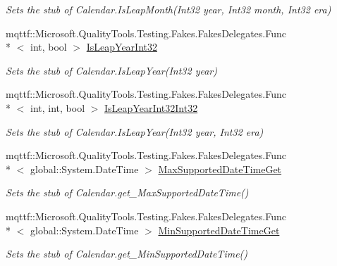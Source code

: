 \begin{DoxyCompactItemize}
\begin{DoxyCompactList}\small\item\em Sets the stub of Calendar.\-Is\-Leap\-Month(\-Int32 year, Int32 month, Int32 era)\end{DoxyCompactList}\item 
mqttf\-::\-Microsoft.\-Quality\-Tools.\-Testing.\-Fakes.\-Fakes\-Delegates.\-Func\\*
$<$ int, bool $>$ \hyperlink{class_system_1_1_globalization_1_1_fakes_1_1_stub_calendar_a231e789a556232a3eebb94a0ccdc7a7a}{Is\-Leap\-Year\-Int32}
\begin{DoxyCompactList}\small\item\em Sets the stub of Calendar.\-Is\-Leap\-Year(\-Int32 year)\end{DoxyCompactList}\item 
mqttf\-::\-Microsoft.\-Quality\-Tools.\-Testing.\-Fakes.\-Fakes\-Delegates.\-Func\\*
$<$ int, int, bool $>$ \hyperlink{class_system_1_1_globalization_1_1_fakes_1_1_stub_calendar_a16839d657b3c5f3bc3d4754ace33a3ba}{Is\-Leap\-Year\-Int32\-Int32}
\begin{DoxyCompactList}\small\item\em Sets the stub of Calendar.\-Is\-Leap\-Year(\-Int32 year, Int32 era)\end{DoxyCompactList}\item 
mqttf\-::\-Microsoft.\-Quality\-Tools.\-Testing.\-Fakes.\-Fakes\-Delegates.\-Func\\*
$<$ global\-::\-System.\-Date\-Time $>$ \hyperlink{class_system_1_1_globalization_1_1_fakes_1_1_stub_calendar_a97bd3888262c80d79a0affc28177d8f3}{Max\-Supported\-Date\-Time\-Get}
\begin{DoxyCompactList}\small\item\em Sets the stub of Calendar.\-get\-\_\-\-Max\-Supported\-Date\-Time()\end{DoxyCompactList}\item 
mqttf\-::\-Microsoft.\-Quality\-Tools.\-Testing.\-Fakes.\-Fakes\-Delegates.\-Func\\*
$<$ global\-::\-System.\-Date\-Time $>$ \hyperlink{class_system_1_1_globalization_1_1_fakes_1_1_stub_calendar_a967748574f842e2576fbdf50de11dc65}{Min\-Supported\-Date\-Time\-Get}
\begin{DoxyCompactList}\small\item\em Sets the stub of Calendar.\-get\-\_\-\-Min\-Supported\-Date\-Time()\end{DoxyCompactList}\item 

\end{DoxyCompactItemize}
